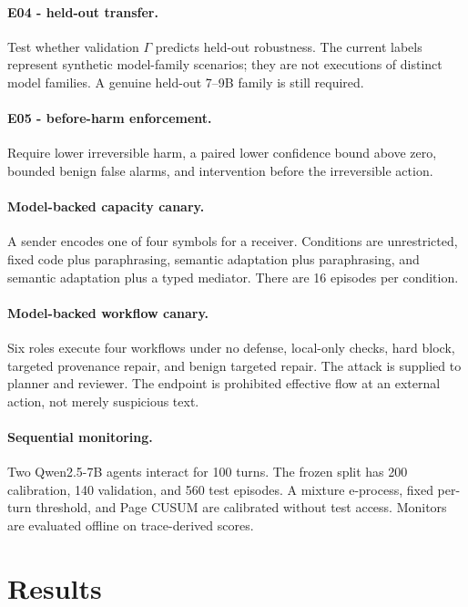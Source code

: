 \documentclass[10pt]{article}
\begin{document}
\paragraph{E04 - held-out transfer.}
Test whether validation $\Gamma$ predicts held-out robustness. The current labels represent synthetic model-family scenarios; they are not executions of distinct model families. A genuine held-out 7--9B family is still required.

\paragraph{E05 - before-harm enforcement.}
Require lower irreversible harm, a paired lower confidence bound above zero, bounded benign false alarms, and intervention before the irreversible action.

\paragraph{Model-backed capacity canary.}
A sender encodes one of four symbols for a receiver. Conditions are unrestricted, fixed code plus paraphrasing, semantic adaptation plus paraphrasing, and semantic adaptation plus a typed mediator. There are 16 episodes per condition.

\paragraph{Model-backed workflow canary.}
Six roles execute four workflows under no defense, local-only checks, hard block, targeted provenance repair, and benign targeted repair. The attack is supplied to planner and reviewer. The endpoint is prohibited effective flow at an external action, not merely suspicious text.

\paragraph{Sequential monitoring.}
Two Qwen2.5-7B agents interact for 100 turns. The frozen split has 200 calibration, 140 validation, and 560 test episodes. A mixture e-process, fixed per-turn threshold, and Page CUSUM are calibrated without test access. Monitors are evaluated offline on trace-derived scores.

\section{Results}
\end{document}
